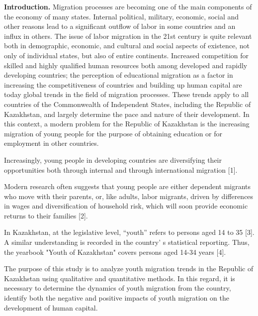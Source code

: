 \begin{multicols}{2}
{\bfseries Introduction.} Migration processes are becoming one of the main
components of the economy of many states. Internal political, military,
economic, social and other reasons lead to a significant outflow of
labor in some countries and an influx in others. The issue of labor
migration in the 21st century is quite relevant both in demographic,
economic, and cultural and social aspects of existence, not only of
individual states, but also of entire continents. Increased competition
for skilled and highly qualified human resources both among developed
and rapidly developing countries; the perception of educational
migration as a factor in increasing the competitiveness of countries and
building up human capital are today global trends in the field of
migration processes. These trends apply to all countries of the
Commonwealth of Independent States, including the Republic of
Kazakhstan, and largely determine the pace and nature of their
development. In this context, a modern problem for the Republic of
Kazakhstan is the increasing migration of young people for the purpose
of obtaining education or for employment in other countries.

Increasingly, young people in developing countries are diversifying
their opportunities both through internal and through international
migration {[}1{]}.

Modern research often suggests that young people are either dependent
migrants who move with their parents, or, like adults, labor migrants,
driven by differences in wages and diversification of household risk,
which will soon provide economic returns to their families {[}2{]}.

In Kazakhstan, at the legislative level, ``youth'' refers to persons
aged 14 to 35 {[}3{]}. A similar understanding is recorded in the
country' s statistical reporting. Thus, the yearbook
"Youth of Kazakhstan" covers persons aged 14-34 years {[}4{]}.

The purpose of this study is to analyze youth migration trends in the
Republic of Kazakhstan using qualitative and quantitative methods. In
this regard, it is necessary to determine the dynamics of youth
migration from the country, identify both the negative and positive
impacts of youth migration on the development of human capital.


\end{multicols}
